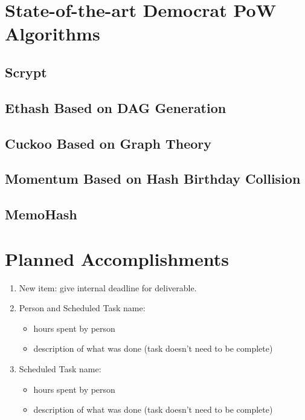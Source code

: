 \documentclass[11pt]{article}
\begin{document}
\section{State-of-the-art Democrat PoW Algorithms}

\subsection{Scrypt}

\subsection{Ethash Based on DAG Generation}

\subsection{Cuckoo Based on Graph Theory}

\subsection{Momentum Based on Hash Birthday Collision}

\subsection{MemoHash}



\section{Planned Accomplishments}
\begin{enumerate}
\item New item: give internal deadline for deliverable.
\item Person and Scheduled Task name:
   \begin{itemize}
      \item hours spent by person
      \item description of what was done (task doesn't need to be complete)
   \end{itemize}
\item Scheduled Task name:
   \begin{itemize}
      \item hours spent by person
      \item description of what was done (task doesn't need to be complete)
   \end{itemize}
\end{enumerate}
\end{document}
